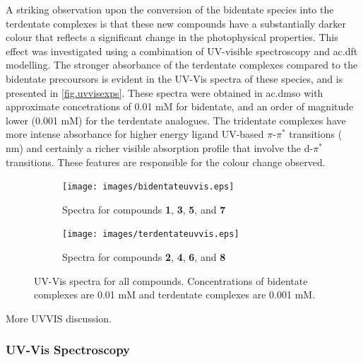 A striking observation upon the conversion of the bidentate species into the terdentate complexes is that these new compounds have a substantially darker colour that reflects a significant change in the photophysical properties. This effect was investigated using a combination of UV-visible spectroscopy and \gls{ac.dft} modelling. The stronger  absorbance of the terdentate complexes compared to the bidentate precoursors is evident in the UV-Vis spectra of these species, and is presented in \autoref{fig.uvvisexps}. These spectra were obtained in \gls{ac.dmso} with approximate concetrations of 0.01 mM for bidentate, and an order of magnitude lower (0.001 mM) for the terdentate analogues. The tridentate complexes have more intense absorbance for higher energy ligand UV-based $\pi$-$\pi^\ast$ transitions ( nm) and certainly a richer visible absorption profile that involve the d-$\pi^\ast$ transitions. These features are responsible for the colour change observed.


\begin{figure}[!htbp]
 \centering
 \begin{subfigure}[b]{0.5\textwidth}
  \texttt{[image: images/bidentateuvvis.eps]}
  \caption{Spectra for compounds \textbf{1}, \textbf{3}, \textbf{5}, and \textbf{7}}
  \label{fig.uvvisbids}
 \end{subfigure}
 \begin{subfigure}[b]{0.5\textwidth}
  \texttt{[image: images/terdentateuvvis.eps]}
  \caption{Spectra for compounds \textbf{2}, \textbf{4}, \textbf{6}, and \textbf{8}}
  \label{fig.uvvisters}
 \end{subfigure}
\caption[UV-Vis spectra for all compounds]{UV-Vis spectra for all compounds. Concentrations of bidentate complexes are 0.01 mM and terdentate complexes are 0.001 mM.}
\label{fig.uvvisexps}
\end{figure} 

More UVVIS discussion.



\subsubsection{UV-Vis Spectroscopy}

